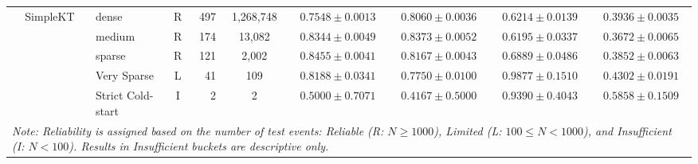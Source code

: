 \begin{table}[tbp]
{\begin{tabular}{lllcrccccc}
 & SimpleKT & dense & R & 497 & 1,268,748 & $0.7548 \pm 0.0013$ & $0.8060 \pm 0.0036$ & $0.6214 \pm 0.0139$ & $0.3936 \pm 0.0035$ \\
 &  & medium & R & 174 & 13,082 & $0.8344 \pm 0.0049$ & $0.8373 \pm 0.0052$ & $0.6195 \pm 0.0337$ & $0.3672 \pm 0.0065$ \\
 &  & sparse & R & 121 & 2,002 & $0.8455 \pm 0.0041$ & $0.8167 \pm 0.0043$ & $0.6889 \pm 0.0486$ & $0.3852 \pm 0.0063$ \\
 &  & Very Sparse & L & 41 & 109 & $0.8188 \pm 0.0341$ & $0.7750 \pm 0.0100$ & $0.9877 \pm 0.1510$ & $0.4302 \pm 0.0191$ \\
 &  & Strict Cold-start & I & 2 & 2 & $0.5000 \pm 0.7071$ & $0.4167 \pm 0.5000$ & $0.9390 \pm 0.4043$ & $0.5858 \pm 0.1509$ \\
\bottomrule
\multicolumn{10}{p{11.5cm}}{\scriptsize \textit{Note: Reliability is assigned based on the number of test events: Reliable (R: $N \ge 1000$), Limited (L: $100 \le N < 1000$), and Insufficient (I: $N < 100$). Results in Insufficient buckets are descriptive only.}} \\
\end{tabular}%
}
\end{table}
